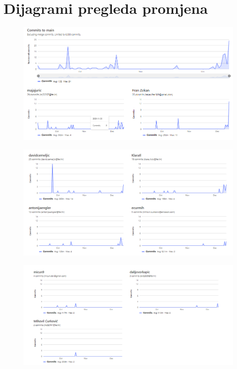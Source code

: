 \eject
\section*{Dijagrami pregleda promjena}

\begin{figure}[H]
	\includegraphics[width=\textwidth]{slike/dijagrampregledapromjena1.png} 
	\label{fig:baza} 
\end{figure}

\begin{figure}[H]
	\includegraphics[width=\textwidth]{slike/dijagrampregledapromjena2.png} 
	\label{fig:baza} 
\end{figure}

\begin{figure}[H]
	\includegraphics[width=\textwidth]{slike/dijagrampregledapromjena3.png} 
	\label{fig:baza} 
\end{figure}
\eject